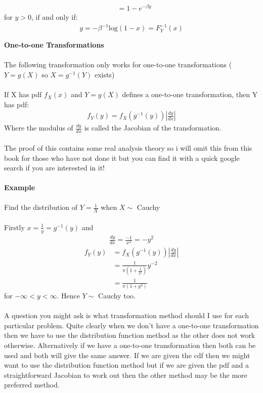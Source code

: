 \documentclass[,oneside]{article}
\begin{document}
\begin{enumerate}
\begin{align*}
&= 1-e^{-\beta y}
\end{align*}
for $y > 0$, if and only if: 
\begin{align*}
y = -\beta^{-1}\text{log}(1-x)=F_Y^{-1}(x)\\ \\
\end{align*}
\textbf{One-to-one Transformations}\\ \\
The following transformation only works for one-to-one transformations ($Y=g(X)$ so $X=g^{-1}(Y)$ exists)\\ \\
If X has pdf $f_X(x)$ and $Y = g(X)$ defines a one-to-one transformation, then Y has pdf:
\begin{align*}
f_Y(y)=f_X(g^{-1}(y))\left | \frac{dy}{dx} \right |
\end{align*}
Where the modulus of $\frac{dy}{dx}$ is called the Jacobian of the transformation.\\ \\
The proof of this contains some real analysis theory so i will omit this from this book for those who have not done it but you can find it with a quick google search if you are interested in it!\\ \\
\textbf{Example}\\ \\
Find the distribution of $Y=\frac{1}{X}$ when $X \sim$ Cauchy \\ \\
Firstly $x=\frac{1}{y}=g^{-1}(y)$ and
\begin{align*}
\frac{dy}{dx}=\frac{-1}{x^2}=-y^2
\end{align*}
\begin{align*}
f_Y(y)&=f_X(g^{-1}(y))\left | \frac{dy}{dx} \right |\\
&=\frac{1}{\pi (1+\frac{1}{y^2})}y^{-2}\\
&=\frac{1}{\pi (1+y^2)}
\end{align*}
for $-\infty < y < \infty$. Hence $Y \sim$ Cauchy too.\\ \\
A question you might ask is what transformation method should I use for each particular problem. Quite clearly when we don't have a one-to-one transformation then we have to use the distribution function method as the other does not work otherwise. Alternatively if we have a one-to-one transformation then both can be used and both will give the same answer. If we are given the cdf then we might want to use the distribution function method but if we are given the pdf and a straightforward Jacobian to work out then the other method may be the more preferred method. 
\pagebreak

\end{enumerate}
\end{document}
